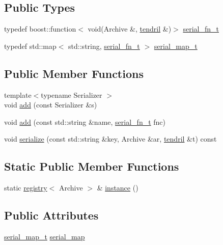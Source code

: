 \subsection*{Public Types}
\begin{DoxyCompactItemize}
\item 
typedef boost\+::function$<$ void(Archive \&, \hyperlink{classecto_1_1tendril}{tendril} \&)$>$ \hyperlink{structecto_1_1serialization_1_1registry_a9bbc5358e0b5bb519983c16db9c6391b}{serial\+\_\+fn\+\_\+t}
\item 
typedef std\+::map$<$ std\+::string, \hyperlink{structecto_1_1serialization_1_1registry_a9bbc5358e0b5bb519983c16db9c6391b}{serial\+\_\+fn\+\_\+t} $>$ \hyperlink{structecto_1_1serialization_1_1registry_a89253dc4749e297b132dacb9e14967c2}{serial\+\_\+map\+\_\+t}
\end{DoxyCompactItemize}
\subsection*{Public Member Functions}
\begin{DoxyCompactItemize}
\item 
{\footnotesize template$<$typename Serializer $>$ }\\void \hyperlink{structecto_1_1serialization_1_1registry_ae82f89f8e2bdcf2573671a6d390a94e2}{add} (const Serializer \&s)
\item 
void \hyperlink{structecto_1_1serialization_1_1registry_a9642b0813d8bb6c99dffb527b9d57419}{add} (const std\+::string \&name, \hyperlink{structecto_1_1serialization_1_1registry_a9bbc5358e0b5bb519983c16db9c6391b}{serial\+\_\+fn\+\_\+t} fnc)
\item 
void \hyperlink{structecto_1_1serialization_1_1registry_afaecca49afab42cb3f41a7a515b69cbb}{serialize} (const std\+::string \&key, Archive \&ar, \hyperlink{classecto_1_1tendril}{tendril} \&t) const 
\end{DoxyCompactItemize}
\subsection*{Static Public Member Functions}
\begin{DoxyCompactItemize}
\item 
static \hyperlink{structecto_1_1serialization_1_1registry}{registry}$<$ Archive $>$ \& \hyperlink{structecto_1_1serialization_1_1registry_a19aae99a3cc5ddb4b56d069faf01e300}{instance} ()
\end{DoxyCompactItemize}
\subsection*{Public Attributes}
\begin{DoxyCompactItemize}
\item 
\hyperlink{structecto_1_1serialization_1_1registry_a89253dc4749e297b132dacb9e14967c2}{serial\+\_\+map\+\_\+t} \hyperlink{structecto_1_1serialization_1_1registry_a7ef09466a24edc21695e3905c0a7921b}{serial\+\_\+map}
\end{DoxyCompactItemize}
